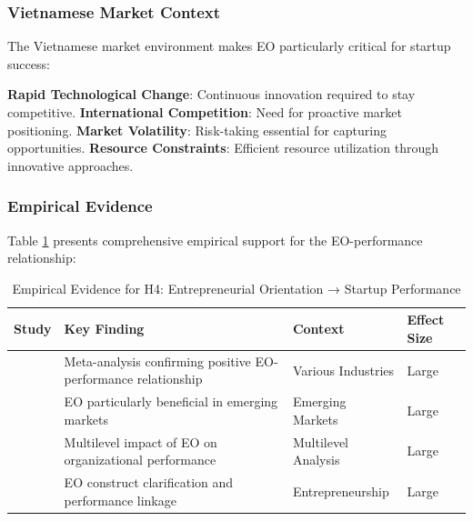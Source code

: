 \documentclass[../Main.tex]{subfiles}
\begin{document}
    \subsubsection{Vietnamese Market Context}
    The Vietnamese market environment makes EO particularly critical for startup success:

    \textbf{Rapid Technological Change}: Continuous innovation required to stay competitive. 
    \textbf{International Competition}: Need for proactive market positioning. 
    \textbf{Market Volatility}: Risk-taking essential for capturing opportunities. 
    \textbf{Resource Constraints}: Efficient resource utilization through innovative approaches.

    \subsubsection{Empirical Evidence}
    Table \ref{tab:h4_evidence} presents comprehensive empirical support for the EO-performance relationship:

    \begin{table}[H]
        \centering
        \caption{Empirical Evidence for H4: Entrepreneurial Orientation → Startup Performance}
        \label{tab:h4_evidence}
        \begin{tabular}{|p{3cm}|p{4cm}|p{3cm}|p{2cm}|}
            \hline
            \textbf{Study} & \textbf{Key Finding} & \textbf{Context} & \textbf{Effect Size} \\
            \hline
            \cite{rauch2009entrepreneurial} & Meta-analysis confirming positive EO-performance relationship & Various Industries & Large \\
            \hline
            \cite{saeed2014entrepreneurial} & EO particularly beneficial in emerging markets & Emerging Markets & Large \\
            \hline
            \cite{wales2013entrepreneurial} & Multilevel impact of EO on organizational performance & Multilevel Analysis & Large \\
            \hline
            \cite{lumpkin1996clarifying} & EO construct clarification and performance linkage & Entrepreneurship & Large \\
            \hline
        \end{tabular}
    \end{table}
\end{document}
